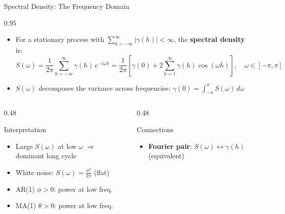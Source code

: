 \documentclass[9pt, aspectratio=169, t]{beamer}
\begin{document}
\begin{frame}{Spectral Density: The Frequency Domain}
    \begin{cminipage}{0.95\textwidth}
        \footnotesize
        \begin{defn}
            \begin{itemize}\setlength{\itemsep}{0pt}
                \item For a stationary process with $\sum_{h=-\infty}^{\infty} |\gamma(h)| < \infty$, the \textbf{spectral density} is:
                \vspace{-1mm}
                \[
                    S(\omega) = \frac{1}{2\pi} \sum_{h=-\infty}^{\infty} \gamma(h)\, e^{-i\omega h} = \frac{1}{2\pi}\left[\gamma(0) + 2\sum_{h=1}^{\infty} \gamma(h)\cos(\omega h)\right], \quad \omega \in [-\pi, \pi]
                \]
                \vspace{-3mm}
                \item $S(\omega)$ decomposes the variance across frequencies: $\gamma(0) = \int_{-\pi}^{\pi} S(\omega)\, d\omega$
            \end{itemize}
        \end{defn}
        \vspace{-2mm}
        \begin{columns}[T]
            \begin{column}{0.48\textwidth}
                \begin{block}{Interpretation}
                    \begin{itemize}\setlength{\itemsep}{0pt}
                        \item Large $S(\omega)$ at low $\omega$ $\Rightarrow$ dominant long cycle
                        \item White noise: $S(\omega) = \frac{\sigma^2}{2\pi}$ (flat)
                        \item AR(1) $\phi > 0$: power at low freq.
                        \item MA(1) $\theta > 0$: power at low freq.
                    \end{itemize}
                \end{block}
            \end{column}
            \begin{column}{0.48\textwidth}
                \begin{exampleblock}{Connections}
                    \begin{itemize}\setlength{\itemsep}{0pt}
                        \item \textbf{Fourier pair}: $S(\omega) \leftrightarrow \gamma(h)$ (equivalent)

\end{itemize}
\end{exampleblock}
\end{column}
\end{columns}
\end{cminipage}
\end{frame}
\end{document}
